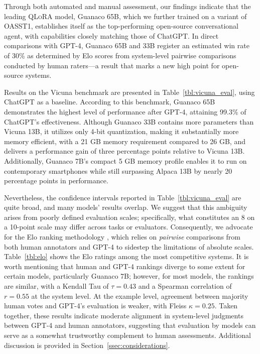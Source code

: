 Through both automated and manual assessment, our findings indicate that the leading \textsc{QLoRA} model, {Guanaco} 65B, which we further trained on a variant of OASST1, establishes itself as the top-performing open-source conversational agent, with capabilities closely matching those of ChatGPT. In direct comparisons with GPT-4, {Guanaco} 65B and 33B register an estimated win rate of 30\% as determined by Elo scores from system-level pairwise comparisons conducted by human raters—a result that marks a new high point for open-source systems.

Results on the Vicuna benchmark \cite{vicuna2023} are presented in Table~\ref{tbl:vicuna_eval}, using ChatGPT as a baseline. According to this benchmark, {Guanaco} 65B demonstrates the highest level of performance after GPT-4, attaining 99.3\% of ChatGPT’s effectiveness. Although {Guanaco} 33B contains more parameters than Vicuna 13B, it utilizes only 4-bit quantization, making it substantially more memory efficient, with a 21 GB memory requirement compared to 26 GB, and delivers a performance gain of three percentage points relative to Vicuna 13B. Additionally, {Guanaco} 7B’s compact 5 GB memory profile enables it to run on contemporary smartphones while still surpassing Alpaca 13B by nearly 20 percentage points in performance.

Nevertheless, the confidence intervals reported in Table~\ref{tbl:vicuna_eval} are quite broad, and many models' results overlap. We suggest that this ambiguity arises from poorly defined evaluation scales; specifically, what constitutes an 8 on a 10-point scale may differ across tasks or evaluators. Consequently, we advocate for the Elo ranking methodology \citep{elo1967proposed}, which relies on \textit{pairwise} comparisons from both human annotators and GPT-4 to sidestep the limitations of absolute scales. Table~\ref{tbl:elo} shows the Elo ratings among the most competitive systems. It is worth mentioning that human and GPT-4 rankings diverge to some extent for certain models, particularly Guanaco 7B; however, for most models, the rankings are similar, with a Kendall Tau of $\tau=0.43$ and a Spearman correlation of $r=0.55$ at the system level. At the example level, agreement between majority human votes and GPT-4’s evaluation is weaker, with Fleiss $\kappa=0.25$. Taken together, these results indicate moderate alignment in system-level judgments between GPT-4 and human annotators, suggesting that evaluation by models can serve as a somewhat trustworthy complement to human assessments. Additional discussion is provided in Section~\ref{ssec:considerations}.

